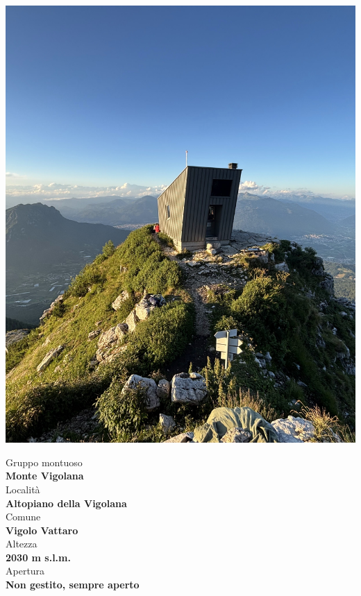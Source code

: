 \documentclass{article}
\begin{document}
\noindent
\begin{minipage}[t]{0.45\textwidth}
  \vspace{0pt} %
  \includegraphics[width=\linewidth]{images/bivacco.jpg}
\end{minipage}%
\hfill
\begin{minipage}[t]{0.5\textwidth}
  \vspace{0pt} %
  
  Gruppo montuoso\\
  \textbf{\large Monte Vigolana}
  \\[1em] %
  Località\\
  \textbf{\large Altopiano della Vigolana}
  \\[1em] %
  Comune\\  
  \textbf{\large Vigolo Vattaro}
  \\[1em] %
  Altezza\\  
  \textbf{\large 2030 m s.l.m.}
  \\[1em] %
  Apertura\\  
  \textbf{\large Non gestito, sempre aperto}

\end{minipage}
\end{document}
